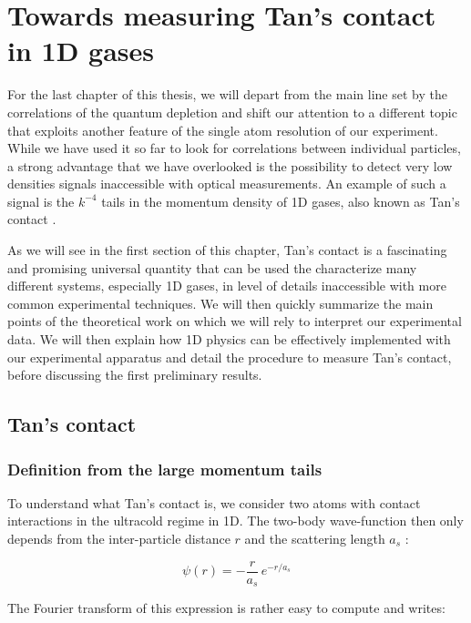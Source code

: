 \chapterimage{}

\chapter{Towards measuring Tan's contact in 1D gases}

For the last chapter of this thesis, we will depart from the main line set by the \kmk correlations of the quantum depletion and shift our attention to a different topic that exploits another feature of the single atom resolution of our experiment. While we have used it so far to look for correlations between individual particles, a strong advantage that we have overlooked is the possibility to detect very low densities signals inaccessible with optical measurements. An example of such a signal is the $k^{-4}$ tails in the momentum density of 1D gases, also known as Tan's contact \cite{tan2008large}. 

As we will see in the first section of this chapter, Tan's contact is a fascinating and promising universal quantity that can be used the characterize many different systems, especially 1D gases, in level of details inaccessible with more common experimental techniques. We will then quickly summarize the main points of the theoretical work \cite{yao2018tan} on which we will rely to interpret our experimental data. We will then explain how 1D physics can be effectively implemented with our experimental apparatus and detail the procedure to measure Tan's contact, before discussing the first preliminary results.


\section{Tan's contact}

\subsection{Definition from the large momentum tails}

To understand what Tan's contact is, we consider two atoms with contact interactions in the ultracold regime in 1D. The two-body wave-function then only depends from the inter-particle distance $r$ and the scattering length $a_s$ \cite{viverit2004momentum}:

\begin{equation}
    \psi(r) = - \frac{r}{a_s} \, e^{-r/a_s}
\end{equation}

\noindent The Fourier transform of this expression is rather easy to compute and writes:


